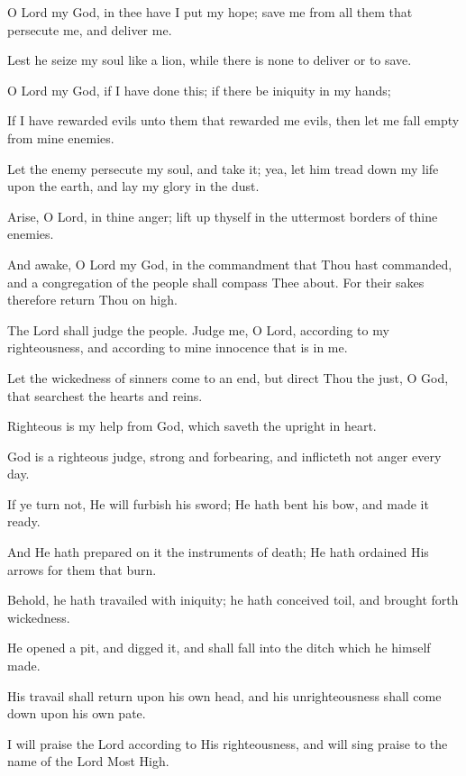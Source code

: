 O Lord my God, in thee have I put my hope; save me from all them that persecute me, and deliver me.

Lest he seize my soul like a lion, while there is none to deliver or to save.

O Lord my God, if I have done this; if there be iniquity in my hands;

If I have rewarded evils unto them that rewarded me evils, then let me fall empty from mine enemies.

Let the enemy persecute my soul, and take it; yea, let him tread down my life upon the earth, and lay my glory in the dust.

Arise, O Lord, in thine anger; lift up thyself in the uttermost borders of thine enemies.

And awake, O Lord my God, in the commandment that Thou hast commanded, and a congregation of the people shall compass Thee about. For their sakes therefore return Thou on high.

The Lord shall judge the people. Judge me, O Lord, according to my righteousness, and according to mine innocence that is in me.

Let the wickedness of sinners come to an end, but direct Thou the just, O God, that searchest the hearts and reins.

Righteous is my help from God, which saveth the upright in heart.

God is a righteous judge, strong and forbearing, and inflicteth not anger every day.

If ye turn not, He will furbish his sword; He hath bent his bow, and made it ready.

And He hath prepared on it the instruments of death; He hath ordained His arrows for them that burn.

Behold, he hath travailed with iniquity; he hath conceived toil, and brought forth wickedness.

He opened a pit, and digged it, and shall fall into the ditch which he himself made.

His travail shall return upon his own head, and his unrighteousness shall come down upon his own pate.

I will praise the Lord according to His righteousness, and will sing praise to the name of the Lord Most High.
